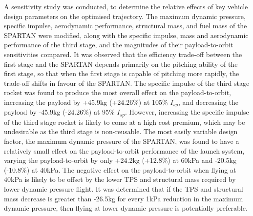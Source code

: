 A sensitivity study was conducted, to determine the relative effects of key vehicle design parameters on the optimised trajectory. 
The maximum dynamic pressure, specific impulse, aerodynamic performance, structural mass, and fuel mass of the SPARTAN were modified, along with the specific impulse, mass and aerodynamic performance of the third stage, and the magnitudes of their payload-to-orbit sensitivities compared. 
It was observed that the efficiency trade-off between the first stage and the SPARTAN depends primarily on the pitching ability of the first stage, so that when the first stage is capable of pitching more rapidly, the trade-off shifts in favour of the SPARTAN. 
The specific impulse of the third stage rocket was found to produce the most overall effect on the payload-to-orbit, increasing the payload by +45.9kg (+24.26\%) at 105\% $I_{sp}$, and decreasing the payload by -45.9kg (-24.26\%) at 95\% $I_{sp}$. However, increasing the specific impulse of the third stage rocket is likely to come at a high cost premium, which may be undesirable as the third stage is non-reusable. 
The most easily variable design factor, the maximum dynamic pressure of the SPARTAN, was found to have a relatively small effect on the payload-to-orbit performance of the launch system, varying the payload-to-orbit by only +24.2kg (+12.8\%) at 60kPa and -20.5kg (-10.8\%) at 40kPa. The negative effect on the payload-to-orbit when flying at 40kPa is likely to be offset by the lower TPS and structural mass required by lower dynamic pressure flight. It was determined that if the TPS and structural mass decrease is greater than -26.5kg for every 1kPa reduction in the maximum dynamic pressure, then flying at lower dynamic pressure is potentially preferable. 







